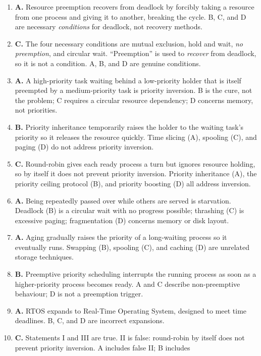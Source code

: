 \begin{enumerate}[label=\textbf{Q\arabic*.}, leftmargin=*]
\item \textbf{A.} Resource preemption recovers from deadlock by forcibly
  taking a resource from one process and giving it to another, breaking the
  cycle. B, C, and D are necessary \emph{conditions} for deadlock, not
  recovery methods.
\item \textbf{C.} The four necessary conditions are mutual exclusion, hold and
  wait, \emph{no preemption}, and circular wait. ``Preemption'' is used to
  \emph{recover} from deadlock, so it is not a condition. A, B, and D are
  genuine conditions.
\item \textbf{A.} A high-priority task waiting behind a low-priority holder
  that is itself preempted by a medium-priority task is priority inversion. B
  is the cure, not the problem; C requires a circular resource dependency; D
  concerns memory, not priorities.
\item \textbf{B.} Priority inheritance temporarily raises the holder to the
  waiting task's priority so it releases the resource quickly. Time slicing
  (A), spooling (C), and paging (D) do not address priority inversion.
\item \textbf{C.} Round-robin gives each ready process a turn but ignores
  resource holding, so by itself it does not prevent priority inversion.
  Priority inheritance (A), the priority ceiling protocol (B), and priority
  boosting (D) all address inversion.
\item \textbf{A.} Being repeatedly passed over while others are served is
  starvation. Deadlock (B) is a circular wait with no progress possible;
  thrashing (C) is excessive paging; fragmentation (D) concerns memory or
  disk layout.
\item \textbf{A.} Aging gradually raises the priority of a long-waiting
  process so it eventually runs. Swapping (B), spooling (C), and caching (D)
  are unrelated storage techniques.
\item \textbf{B.} Preemptive priority scheduling interrupts the running
  process as soon as a higher-priority process becomes ready. A and C describe
  non-preemptive behaviour; D is not a preemption trigger.
\item \textbf{A.} RTOS expands to Real-Time Operating System, designed to meet
  time deadlines. B, C, and D are incorrect expansions.
\item \textbf{C.} Statements I and III are true. II is false: round-robin by
  itself does not prevent priority inversion. A includes false II; B includes

\end{enumerate}
